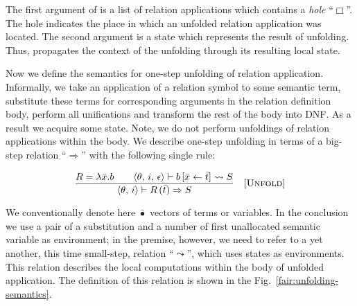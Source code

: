 The first argument of  is a list of relation applications which contains a \emph{hole} ``$\Box$''. The hole indicates the place in which
an unfolded relation application was located. The second argument is a state which represents the result of unfolding. Thus,  propagates the
context of the unfolding through its resulting local state.

Now we define the semantics for one-step unfolding of relation application. Informally, we take an application of a relation symbol to some semantic term, substitute these
terms for corresponding arguments in the relation definition body, perform all unifications and transform the rest of the body into DNF. As a result we acquire some state. Note, we
do not perform unfoldings of relation applications within the body. We describe one-step unfolding in terms of a big-step relation ``$\Rightarrow$'' with the following
single rule:

\[
\begin{array}{cr}
  \dfrac{R = \lambda \bar{x}. b \qquad \langle \theta,\, i,\, \epsilon \rangle \vdash b\,[\bar{x} \leftarrow \bar{t}] \leadsto S}
      {\langle \theta,\,i \rangle \vdash R\,(\bar{t}) \Rightarrow S}
      &     \mbox{[\textsc{Unfold}]}
\end{array}
\]

We conventionally denote here $\bar{\bullet}$ vectors of terms or variables. In the conclusion we use a pair of a substitution and a number of first unallocated semantic variable as
environment; in the premise, however, we need to refer to a yet another, this time small-step, relation ``$\leadsto$'', which uses states as environments. This relation describes the
local computations within the body of unfolded application.  The definition of this relation is shown in the Fig.~\ref{fair:unfolding-semantics}.

